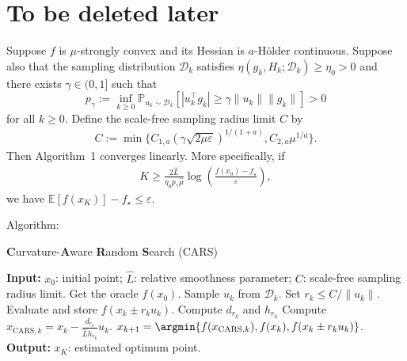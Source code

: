 

\section{To be deleted later}
{\begin{singlespace}
\begin{theorem*}
    Suppose $f$ is $\mu$-strongly convex and its Hessian is $a$-H\"{o}lder continuous. Suppose also that the sampling distribution $\mathcal{D}_k$ satisfies $\eta(g_k, H_k; \mathcal{D}_k) \geq \eta_{0} > 0$ and there exists $\gamma \in (0,1]$ such that
    \begin{equation*}
        p_{\gamma} := \inf_{k\geq 0} \mathbb{P}_{u_k\sim\mathcal{D}_k} \left[ |u_k^{\top}g_k| \geq \gamma\|u_k\|\|g_k\|\right] >0
    \end{equation*}
    for all $k\geq 0$. Define the scale-free sampling radius limit $C$ by
    \begin{align*}
        C := \min \{ C_{1,a} (\gamma \sqrt{2\mu \varepsilon})^{1/(1+a)}, C_{2,a} \mu^{1/a} \}.
    \end{align*}
    Then Algorithm~1 converges linearly. More specifically, if
    \begin{align*}
        K \geq \frac{2\hat{L}}{\eta_0 p_{\gamma}\hat{\mu}} \log\left(\frac{f(x_0) - f_\star}{\varepsilon} \right),
    \end{align*}
    we have $\mathbb{E}[f(x_K)] - f_\star \leq \varepsilon$.
\end{theorem*}
\end{singlespace}
}
\newpage
Algorithm: 
{\begin{singlespace}
    \centering
\begin{minipage}{.7\linewidth}
    \begin{algorithm}[H]
        \caption{\textbf{C}urvature-\textbf{A}ware \textbf{R}andom \textbf{S}earch (CARS)}
            \begin{algorithmic}[1]
                \State \textbf{Input:}  $x_0$: initial point; $\hat{L}$: relative smoothness parameter; $C$: scale-free sampling radius limit.
                \State Get the oracle $f(x_0)$.
                \State Sample $u_k$ from $\mathcal{D}_k$.
                \State Set $r_k \leq C/\|u_k\|$.
                \State Evaluate and store $f(x_{k} \pm r_k u_k)$.
                \State Compute $d_{r_k}$ and $h_{r_k}$
                \State Compute $x_{\textrm{CARS}, k} = x_{k} - \frac{d_{r_k}}{\hat{L}h_{r_k}}u_k$.
                \State $x_{k+1} = \argmin\{f(x_{\textrm{CARS}, k}),f(x_k), f(x_{k} \pm r_k u_k)\}$.
                \EndFor
                \State \textbf{Output:} $x_K$: estimated optimum point.
            \end{algorithmic}
    \end{algorithm}
\end{minipage}
\par
\end{singlespace}
}



